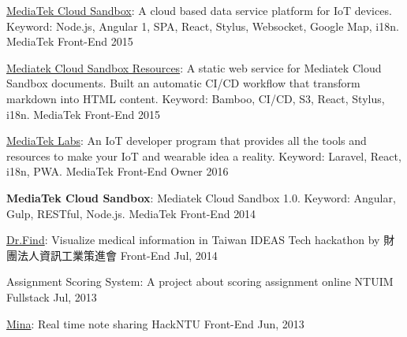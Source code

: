 \begin{cvhonors}
  \cvhonor
    {\href{https://mcs.mediatek.com/}{MediaTek Cloud Sandbox}: \textmd{A cloud based data service platform for IoT devices. Keyword: Node.js, Angular 1, SPA, React, Stylus, Websocket, Google Map, i18n.}} %
    {MediaTek} %
    {Front-End} %
    {2015} %

  \cvhonor
    {\href{https://mcs.mediatek.com/resources/latest/introduction}{Mediatek Cloud Sandbox Resources}: \textmd{A static web service for Mediatek Cloud Sandbox documents. Built an automatic CI/CD workflow that transform markdown into HTML content. Keyword: Bamboo, CI/CD, S3, React, Stylus, i18n.}} %
    {MediaTek} %
    {Front-End} %
    {2015} %

  \cvhonor
    {\href{https://labs.mediatek.com/}{MediaTek Labs}: \textmd{An IoT developer program that provides all the tools and resources to make your IoT and wearable idea a reality. Keyword: Laravel, React, i18n, PWA.}} %
    {MediaTek} %
    {Front-End Owner} %
    {2016} %

  \cvhonor
    {\textbf{MediaTek Cloud Sandbox}: \textmd{Mediatek Cloud Sandbox 1.0. Keyword: Angular, Gulp, RESTful, Node.js.}} %
    {MediaTek} %
    {Front-End} %
    {2014} %

  \cvhonor
    {\href{https://kdchang.cc/Dr.Find}{Dr.Find}: \textmd{Visualize medical information in Taiwan}} %
    {IDEAS Tech hackathon by 財團法人資訊工業策進會} %
    {Front-End} %
    {Jul, 2014} %

  \cvhonor
    {Assignment Scoring System: \textmd{A project about scoring assignment online}} %
    {NTUIM} %
    {Fullstack} %
    {Jul, 2013} %

  \cvhonor
    {\href{http://minna.herokuapp.com}{Mina}: \textmd{Real time note sharing}} %
    {HackNTU} %
    {Front-End} %
    {Jun, 2013} %


\end{cvhonors}
